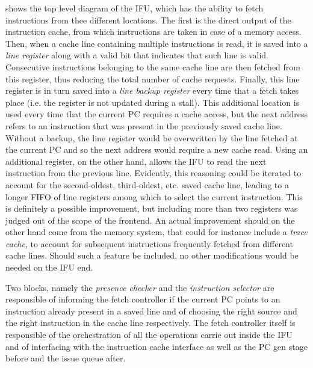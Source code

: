  shows the top level diagram of the \ac{IFU}, which has the ability to fetch instructions from thee different locations. The first is the direct output of the instruction cache, from which instructions are taken in case of a memory access. Then, when a cache line containing multiple instructions is read, it is saved into a \emph{line register} along with a valid bit that indicates that such line is valid. Consecutive instructions belonging to the same cache line are then fetched from this register, thus reducing the total number of cache requests. Finally, this line register is in turn saved into a \emph{line backup register} every time that a fetch takes place (i.e. the register is not updated during a stall). This additional location is used every time that the current \ac{PC} requires a cache access, but the next address refers to an instruction that was present in the previously saved cache line. Without a backup, the line register would be overwritten by the line fetched at the current \ac{PC} and so the next address would require a new cache read. Using an additional register, on the other hand, allows the \ac{IFU} to read the next instruction from the previous line. Evidently, this reasoning could be iterated to account for the second-oldest, third-oldest, etc. saved cache line, leading to a longer \ac{FIFO} of line registers among which to select the current instruction. This is definitely a possible improvement, but including more than two registers was judged out of the scope of the frontend. An actual improvement should on the other hand come from the memory system, that could for instance include a \emph{trace cache}, to account for subsequent instructions frequently fetched from different cache lines. Should such a feature be included, no other modifications would be needed on the \ac{IFU} end.

Two blocks, namely the \emph{presence checker} and the \emph{instruction selector} are responsible of informing the fetch controller if the current \ac{PC} points to an instruction already present in a saved line and of choosing the right source and the right instruction in the cache line respectively. The fetch controller itself is responsible of the orchestration of all the operations carrie out inside the \ac{IFU} and of interfacing with the instruction cache interface as well as the \ac{PC} gen stage before and the issue queue after.

